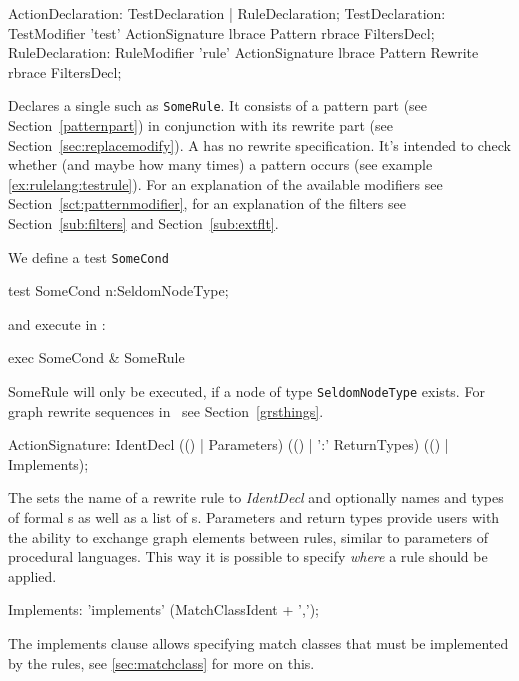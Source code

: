 \begin{rail}
  ActionDeclaration: TestDeclaration | RuleDeclaration;
  TestDeclaration: TestModifier 'test' ActionSignature lbrace Pattern rbrace FiltersDecl;
  RuleDeclaration: RuleModifier 'rule' ActionSignature lbrace Pattern Rewrite rbrace FiltersDecl;
\end{rail}
Declares a single  such as \texttt{SomeRule}.
It consists of a pattern part (see Section~\ref{patternpart}) in conjunction with its rewrite part (see Section~\ref{sec:replacemodify}).
A  has no rewrite specification.
It's intended to check whether (and maybe how many times) a pattern occurs (see example \ref{ex:rulelang:testrule}).
For an explanation of the available modifiers see Section~\ref{sct:patternmodifier},
for an explanation of the filters see Section~\ref{sub:filters} and Section~\ref{sub:extflt}.


\begin{example}
\label{ex:rulelang:testrule}
We define a test \texttt{SomeCond}
\begin{grgen}
test SomeCond {
  n:SeldomNodeType;
}
\end{grgen}
and execute in \GrShell:
\begin{grshell}
  exec SomeCond & SomeRule
\end{grshell}
SomeRule will only be executed, if a node of type \texttt{SeldomNodeType} exists.
For graph rewrite sequences in \GrShell\ see Section~\ref{grsthings}.
\end{example}

\begin{rail}
  ActionSignature: IdentDecl (() | Parameters) (() | ':' ReturnTypes) (() | Implements);
\end{rail}
The  sets the name of a rewrite rule to \emph{IdentDecl} and optionally names and types of formal s as well as a list of s.
Parameters and return types provide users with the ability to exchange graph elements between rules, similar to parameters of procedural languages.
This way it is possible to specify \emph{where} a rule should be applied.

\begin{rail}
  Implements: 'implements' (MatchClassIdent + ',');
\end{rail}
The implements clause allows specifying match classes that must be implemented by the rules, see \ref{sec:matchclass} for more on this.

